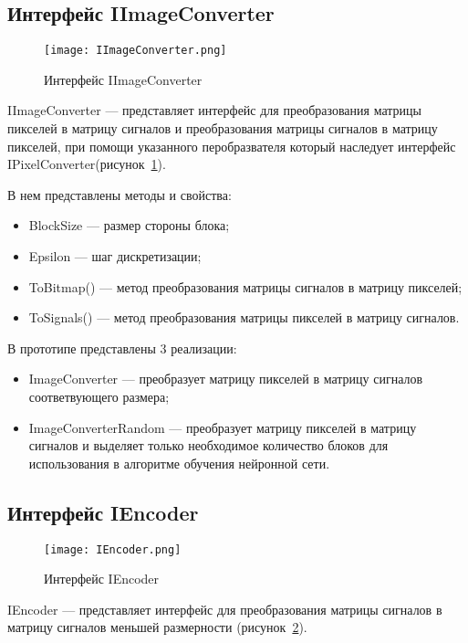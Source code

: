 \subsection{Интерфейс IImageConverter}
\label{subsub:development:iimageconverter}

\begin{figure}[ht]
\centering
  \texttt{[image: IImageConverter.png]}
  \caption{ Интерфейс IImageConverter }
  \label{fig:iimageconverter}
\end{figure}
IImageConverter --- представляет интерфейс для преобразования матрицы пикселей в матрицу сигналов и
преобразования матрицы сигналов в матрицу пикселей, при помощи указанного перобразвателя который наследует интерфейс IPixelConverter(рисунок~\ref{fig:iimageconverter}).

В нем представлены методы и свойства:
\begin{itemize}
  \item BlockSize --- размер стороны блока;
  \item Epsilon --- шаг дискретизации;
  \item ToBitmap() --- метод преобразования матрицы сигналов в матрицу пикселей;
  \item ToSignals() --- метод преобразования матрицы пикселей в матрицу сигналов.
\end{itemize}

В прототипе представлены 3 реализации:
\begin{itemize}
  \item ImageConverter --- преобразует матрицу пикселей в матрицу сигналов соответвующего размера;
  \item ImageConverterRandom --- преобразует матрицу пикселей в матрицу сигналов и выделяет только необходимое
  количество блоков для использования в алгоритме обучения нейронной сети.
\end{itemize}

\subsection{Интерфейс IEncoder}
\label{subsub:development:iencoder}

\begin{figure}[ht]
\centering
  \texttt{[image: IEncoder.png]}
  \caption{ Интерфейс IEncoder }
  \label{fig:iencoder}
\end{figure}
IEncoder --- представляет интерфейс для преобразования матрицы сигналов в матрицу сигналов меньшей размерности (рисунок~\ref{fig:iencoder}).

